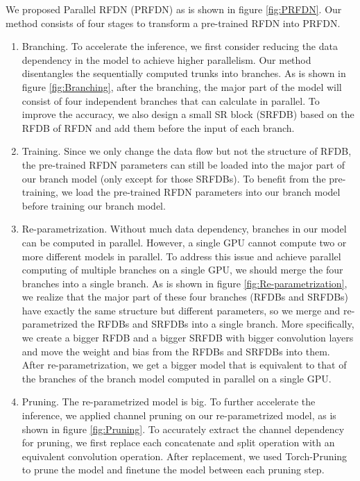 \documentclass{article}
\begin{document}
We proposed Parallel RFDN (PRFDN) as is shown in figure \ref{fig:PRFDN}.
Our method consists of four stages to transform a pre-trained RFDN\cite{liu2020residual} into PRFDN.
\begin{enumerate}
    \item Branching. To accelerate the inference, we first consider reducing the data dependency in the model to achieve higher parallelism. Our method disentangles the sequentially computed trunks into branches. As is shown in figure \ref{fig:Branching}, after the branching, the major part of the model will consist of four independent branches that can calculate in parallel. To improve the accuracy, we also design a small SR block (SRFDB) based on the RFDB of RFDN and add them before the input of each branch. 
    \item Training. Since we only change the data flow but not the structure of RFDB, the pre-trained RFDN parameters can still be loaded into the major part of our branch model (only except for those SRFDBs). To benefit from the pre-training, we load the pre-trained RFDN parameters into our branch model before training our branch model.
    \item Re-parametrization. Without much data dependency, branches in our model can be computed in parallel. However, a single GPU cannot compute two or more different models in parallel. To address this issue and achieve parallel computing of multiple branches on a single GPU, we should merge the four branches into a single branch. As is shown in figure \ref{fig:Re-parametrization}, we realize that the major part of these four branches (RFDBs and SRFDBs) have exactly the same structure but different parameters, so we merge and re-parametrized the RFDBs and SRFDBs into a single branch. More specifically, we create a bigger RFDB and a bigger SRFDB with bigger convolution layers and move the weight and bias from the RFDBs and SRFDBs into them. After re-parametrization, we get a bigger model that is equivalent to that of the branches of the branch model computed in parallel on a single GPU.
    \item Pruning. The re-parametrized model is big. To further accelerate the inference, we applied channel pruning on our re-parametrized model, as is shown in figure \ref{fig:Pruning}. To accurately extract the channel dependency for pruning, we first replace each concatenate and split operation with an equivalent convolution operation. After replacement, we used Torch-Pruning\cite{fang2023depgraph} to prune the model and finetune the model between each pruning step.
\end{enumerate}
\end{document}
